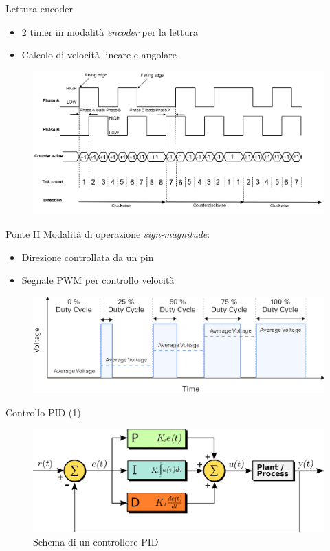 \documentclass{beamer}
\begin{document}
\begin{tframe}{Lettura encoder}
\begin{itemize}
    \item 2 timer in modalità \textit{encoder} per la lettura
    \item Calcolo di velocità lineare e angolare
\end{itemize}
\vspace{3mm}
\begin{figure}
    \centering
    \includegraphics[width=0.85\columnwidth]{img/x4_encoder.png}
\end{figure}

\end{tframe}

\begin{tframe}{Ponte H}
Modalità di operazione \textit{sign-magnitude}:
\begin{itemize}
    \item Direzione controllata da un pin
    \item Segnale PWM per controllo velocità
\end{itemize}
\vspace{6mm}
    \begin{figure}
         \centering
         \includegraphics[width=0.9\columnwidth]{img/pwm.jpg}
    \end{figure}
\end{tframe}

\begin{tframe}{Controllo PID (1)}
\vspace{10mm}
\begin{figure}
    \centering
    \includegraphics[width=0.9\columnwidth]{img/pid.png}
    \caption*{Schema di un controllore PID}
\end{figure}
\end{tframe}
\end{document}
